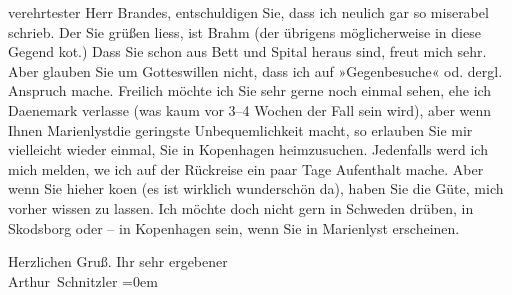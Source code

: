 \pstart{}verehrtester Herr Brandes,\pend\vspace{0.5em}
\pstart
           entschuldigen Sie, dass ich neulich gar so miserabel schrieb. Der Sie grüßen liess,
               ist Brahm (der übrigens möglicherweise in
               diese Gegend ko{\geminationm}t.) Dass Sie schon aus Bett und Spital
               heraus sind, freut mich sehr. Aber glauben Sie um Gotteswillen nicht, dass ich auf
               »Gegenbesuche« od. dergl. Anspruch mache. Freilich möchte ich Sie sehr gerne noch
               einmal sehen, ehe ich Daenemark verlasse (was
               kaum vor 3–4 Wochen der Fall sein wird), aber wenn Ihnen Marienlystdie geringste Unbequemlichkeit macht, so erlauben
               Sie mir vielleicht wieder einmal, Sie in Kopenhagen heimzusuchen. Jedenfalls werd ich mich melden, we{\geminationn} ich auf der Rückreise ein paar Tage Aufenthalt mache.
               Aber wenn Sie hieher ko{\geminationm}en (es ist wirklich wunderschön
               da), haben Sie die Güte, mich vorher wissen zu lassen. Ich möchte doch nicht gern in
                  Schweden drüben, in Skodsborg oder – in Kopenhagen sein, wenn Sie in Marienlyst
               erscheinen.\pend
           
\pstart
           Herzlichen Gruß. Ihr sehr ergebener{\\[\baselineskip]}\spacefill\mbox{Arthur Schnitzler}\pend
           \leftskip=0em{}\endnumbering{}  \newcommand{\dateiname}{L01610}\newcommand{\titel}{Arthur Schnitzler an Georg Brandes, 13. 7. 1906}\newcommand{\editorInnen}{Martin Anton Müller und Gerd-Hermann Susen}
